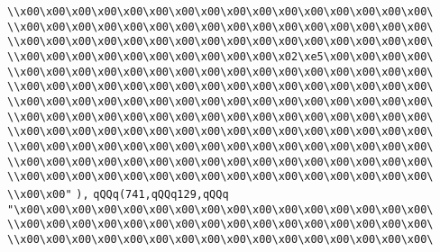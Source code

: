 \verb|\\x00\x00\x00\x00\x00\x00\x00\x00\x00\x00\x00\x00\x00\x00\x00\x00\|\newline
\verb|\\x00\x00\x00\x00\x00\x00\x00\x00\x00\x00\x00\x00\x00\x00\x00\x00\|\newline
\verb|\\x00\x00\x00\x00\x00\x00\x00\x00\x00\x00\x00\x00\x00\x00\x00\x00\|\newline
\verb|\\x00\x00\x00\x00\x00\x00\x00\x00\x00\x00\x02\xe5\x00\x00\x00\x00\|\newline
\verb|\\x00\x00\x00\x00\x00\x00\x00\x00\x00\x00\x00\x00\x00\x00\x00\x00\|\newline
\verb|\\x00\x00\x00\x00\x00\x00\x00\x00\x00\x00\x00\x00\x00\x00\x00\x00\|\newline
\verb|\\x00\x00\x00\x00\x00\x00\x00\x00\x00\x00\x00\x00\x00\x00\x00\x00\|\newline
\verb|\\x00\x00\x00\x00\x00\x00\x00\x00\x00\x00\x00\x00\x00\x00\x00\x00\|\newline
\verb|\\x00\x00\x00\x00\x00\x00\x00\x00\x00\x00\x00\x00\x00\x00\x00\x00\|\newline
\verb|\\x00\x00\x00\x00\x00\x00\x00\x00\x00\x00\x00\x00\x00\x00\x00\x00\|\newline
\verb|\\x00\x00\x00\x00\x00\x00\x00\x00\x00\x00\x00\x00\x00\x00\x00\x00\|\newline
\verb|\\x00\x00\x00\x00\x00\x00\x00\x00\x00\x00\x00\x00\x00\x00\x00\x00\|\newline
\verb|\\x00\x00"|\newline
\verb|),|\newline
\verb|qQQq(741,qQQq129,qQQq|\newline
\verb|"\x00\x00\x00\x00\x00\x00\x00\x00\x00\x00\x00\x00\x00\x00\x00\x00\|\newline
\verb|\\x00\x00\x00\x00\x00\x00\x00\x00\x00\x00\x00\x00\x00\x00\x00\x00\|\newline
\verb|\\x00\x00\x00\x00\x00\x00\x00\x00\x00\x00\x00\x00\x00\x00\x00\x00\|\newline
